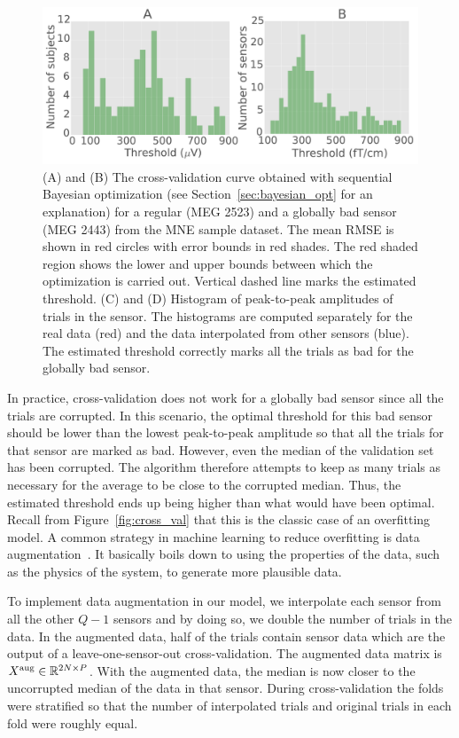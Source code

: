 \begin{figure}[ht!]
    \centering
    \includegraphics[width=0.7\linewidth]{figures/figure2.pdf}
    \caption{(A) and (B) The cross-validation curve obtained with sequential Bayesian optimization (see Section~\ref{sec:bayesian_opt} for an explanation) for a regular (MEG 2523) and a globally bad sensor (MEG 2443) from the MNE sample dataset. The mean RMSE is shown in red circles with error bounds in red shades. The red shaded region shows the lower and upper bounds between which the optimization is carried out. Vertical dashed line marks the estimated threshold. (C) and (D) Histogram of peak-to-peak amplitudes of trials in the sensor. The histograms are computed separately for the real data (red) and the data interpolated from other sensors (blue). The estimated threshold correctly marks all the trials as bad for the globally bad sensor.}
    \label{fig:cross_val_hist}
\end{figure}

In practice, cross-validation does not work for a globally bad sensor since all the trials are corrupted. In this scenario, the optimal threshold for this bad sensor should be lower than the lowest peak-to-peak amplitude so that all the trials for that sensor are marked as bad. However, even the median of the validation set has been corrupted. The algorithm therefore attempts to keep as many trials as necessary for the average to be close to the corrupted median. Thus, the estimated threshold ends up being higher than what would have been optimal. Recall from Figure~\ref{fig:cross_val} that this is the classic case of an overfitting model. A common strategy in machine learning to reduce overfitting is data augmentation~\citep{krizhevsky2012imagenet}. It basically boils down to using the properties of the data, such as the physics of the system, to generate more plausible data.

To implement data augmentation in our model, we interpolate each sensor from all the other $Q-1$ sensors and by doing so, we double the number of trials in the data. In the augmented data, half of the trials contain sensor data which are the output of a leave-one-sensor-out cross-validation. The augmented data matrix is $X^{\textrm{aug}} \in \mathbb{R}^{2N \times P}$. With the augmented data, the median is now closer to the uncorrupted median of the data in that sensor. During cross-validation the folds were stratified so that the number of interpolated trials and original trials in each fold were roughly equal.

